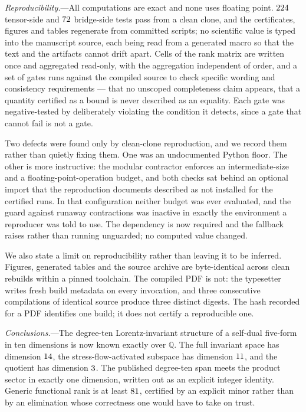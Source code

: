 \documentclass[
  aps,prd,
  reprint,
  letterpaper,
  amsmath,amssymb,
  nofootinbib,
  superscriptaddress
]{revtex4-2}
\theoremstyle{plain}
\newcommand{\Q}{\mathbb{Q}}
\begin{document}
\emph{Reproducibility.}---All computations are exact and none uses floating
point. $224$ tensor-side and $72$ bridge-side tests pass
from a clean clone, and the certificates, figures and tables regenerate from
committed scripts; no scientific value is typed into the manuscript source, each
being read from a generated macro so that the text and the artifacts cannot
drift apart. Cells of the rank matrix are written once and aggregated read-only,
with the aggregation independent of order, and a set of gates runs against the
compiled source to check specific wording and consistency requirements --- that
no unscoped completeness claim appears, that a quantity certified as a bound is
never described as an equality. Each gate was negative-tested by deliberately
violating the condition it detects, since a gate that cannot fail is not a gate.

Two defects were found only by clean-clone reproduction, and we record them
rather than quietly fixing them. One was an undocumented Python floor. The other
is more instructive: the modular contractor enforces an intermediate-size and a
floating-point-operation budget, and both checks sat behind an optional import
that the reproduction documents described as not installed for the certified
runs. In that configuration neither budget was ever evaluated, and the guard
against runaway contractions was inactive in exactly the environment a
reproducer was told to use. The dependency is now required and the fallback
raises rather than running unguarded; no computed value changed.

We also state a limit on reproducibility rather than leaving it to be inferred.
Figures, generated tables and the source archive are byte-identical across clean
rebuilds within a pinned toolchain. The compiled PDF is not: the typesetter
writes fresh build metadata on every invocation, and three consecutive
compilations of identical source produce three distinct digests. The hash
recorded for a PDF identifies one build; it does not certify a reproducible one.

\emph{Conclusions.}---The degree-ten Lorentz-invariant structure of a self-dual
five-form in ten dimensions is now known exactly over $\Q$. The full invariant
space has dimension $14$, the stress-flow-activated subspace has
dimension $11$, and the quotient has dimension $3$. The published
degree-ten span meets the product sector in exactly one dimension, written out
as an explicit integer identity. Generic functional rank is at least
$81$, certified by an explicit minor rather than by an
elimination whose correctness one would have to take on trust.
\end{document}
